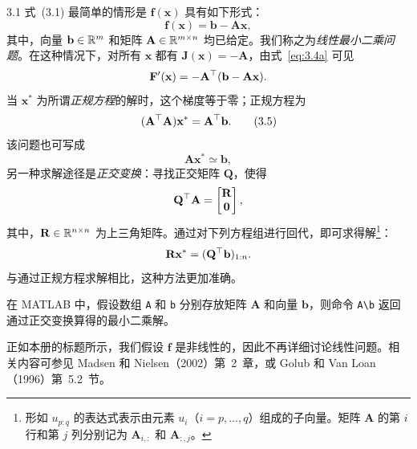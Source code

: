 \begin{example}{3.1}
式~(3.1) 最简单的情形是 $\mathbf{f}(\mathbf{x})$ 具有如下形式：
\[
  \mathbf{f}(\mathbf{x})=\mathbf{b}-\mathbf{A}\mathbf{x},
\]
其中，向量 $\mathbf{b}\in\mathbb{R}^m$ 和矩阵 $\mathbf{A}\in\mathbb{R}^{m\times n}$ 均已给定。我们称之为\emph{线性最小二乘问题}。在这种情况下，对所有 $\mathbf{x}$ 都有 $\mathbf{J}(\mathbf{x})=-\mathbf{A}$，由式~\eqref{eq:3.4a} 可见
\[
  \mathbf{F}'(\mathbf{x})=-\mathbf{A}^{\top}(\mathbf{b}-\mathbf{A}\mathbf{x}).
\]
当 $\mathbf{x}^*$ 为所谓\emph{正规方程}的解时，这个梯度等于零；正规方程为
\begin{equation}
  (\mathbf{A}^{\top}\mathbf{A})\mathbf{x}^*=\mathbf{A}^{\top}\mathbf{b}.
  \tag{3.5}\label{eq:3.5}
\end{equation}
该问题也可写成
\[
  \mathbf{A}\mathbf{x}^*\simeq\mathbf{b},
\]
另一种求解途径是\emph{正交变换}：寻找正交矩阵 $\mathbf{Q}$，使得
\[
  \mathbf{Q}^{\top}\mathbf{A}=\begin{bmatrix}\mathbf{R}\\\mathbf{0}\end{bmatrix},
\]
其中，$\mathbf{R}\in\mathbb{R}^{n\times n}$ 为上三角矩阵。通过对下列方程组进行回代，即可求得解\footnote{形如 $u_{p:q}$ 的表达式表示由元素 $u_i$（$i=p,\ldots,q$）组成的子向量。矩阵 $\mathbf{A}$ 的第 $i$ 行和第 $j$ 列分别记为 $\mathbf{A}_{i,:}$ 和 $\mathbf{A}_{:,j}$。}：
\[
  \mathbf{R}\mathbf{x}^*=(\mathbf{Q}^{\top}\mathbf{b})_{1:n}.
\]
与通过正规方程求解相比，这种方法更加准确。

在 MATLAB 中，假设数组 \texttt{A} 和 \texttt{b} 分别存放矩阵 $\mathbf{A}$ 和向量 $\mathbf{b}$，则命令 \verb|A\b| 返回通过正交变换算得的最小二乘解。

正如本册的标题所示，我们假设 $\mathbf{f}$ 是非线性的，因此不再详细讨论线性问题。相关内容可参见 Madsen 和 Nielsen（2002）第~2~章，或 Golub 和 Van Loan（1996）第~5.2~节。
\end{example}

